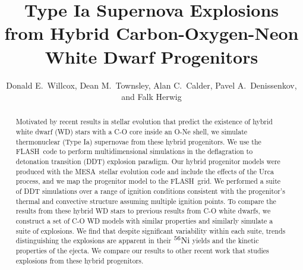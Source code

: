 \documentclass[iop,apj]{emulateapj}
\newcommand{\Ni}[1]{\ensuremath{{}^{#1}{\rm Ni}}}
\newcommand{\code}[1]{\textsc{#1}}
\newcommand{\FLASH}{\code{FLASH}}
\newcommand{\MESA}{\code{MESA}}
\begin{document}
\title{Type Ia Supernova Explosions from Hybrid Carbon-Oxygen-Neon White Dwarf Progenitors}

\author{
Donald E.\ Willcox,
Dean M.\ Townsley,
Alan C.\ Calder,
Pavel A.\ Denissenkov,
and Falk Herwig
}


\begin{abstract}
Motivated by recent results in stellar evolution that predict the
existence of hybrid white dwarf (WD) stars with a C-O core inside an
O-Ne shell, we simulate thermonuclear (Type Ia) supernovae from these
hybrid progenitors. We use the \FLASH\ code to perform
multidimensional simulations in the deflagration to detonation
transition (DDT) explosion paradigm. Our hybrid progenitor models were
produced with the \MESA\ stellar evolution code and include the
effects of the Urca process, and we map the progenitor model to the
\FLASH\ grid. We performed a suite of DDT simulations over a range of
ignition conditions consistent with the progenitor's thermal and
convective structure assuming multiple ignition points. To compare the
results from these hybrid WD stars to previous results from C-O white
dwarfs, we construct a set of C-O WD models with similar properties
and similarly simulate a suite of explosions.  We find that despite
significant variability within each suite, trends distinguishing the
explosions are apparent in their \Ni{56} yields and the kinetic
properties of the ejecta. We compare our results to other
  recent work that studies explosions from these hybrid progenitors.
\end{abstract}

\end{document}
